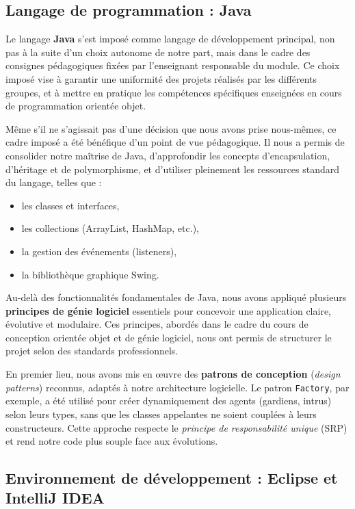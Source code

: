 \subsection{Langage de programmation : Java}

Le langage \textbf{Java} s’est imposé comme langage de développement principal, non pas à la suite d’un choix autonome de notre part, mais dans le cadre des consignes pédagogiques fixées par l’enseignant responsable du module. Ce choix imposé vise à garantir une uniformité des projets réalisés par les différents groupes, et à mettre en pratique les compétences spécifiques enseignées en cours de programmation orientée objet.

Même s’il ne s’agissait pas d’une décision que nous avons prise nous-mêmes, ce cadre imposé a été bénéfique d’un point de vue pédagogique. Il nous a permis de consolider notre maîtrise de Java, d’approfondir les concepts d'encapsulation, d’héritage et de polymorphisme, et d’utiliser pleinement les ressources standard du langage, telles que :
\begin{itemize}
    \item les classes et interfaces,
    \item les collections (ArrayList, HashMap, etc.),
    \item la gestion des événements (listeners),
    \item la bibliothèque graphique Swing.
\end{itemize}
Au-delà des fonctionnalités fondamentales de Java, nous avons appliqué plusieurs \textbf{principes de génie logiciel} essentiels pour concevoir une application claire, évolutive et modulaire. Ces principes, abordés dans le cadre du cours de conception orientée objet et de génie logiciel, nous ont permis de structurer le projet selon des standards professionnels.

En premier lieu, nous avons mis en œuvre des \textbf{patrons de conception} (\textit{design patterns}) reconnus, adaptés à notre architecture logicielle. Le patron \texttt{Factory}, par exemple, a été utilisé pour créer dynamiquement des agents (gardiens, intrus) selon leurs types, sans que les classes appelantes ne soient couplées à leurs constructeurs. Cette approche respecte le \textit{principe de responsabilité unique} (SRP) et rend notre code plus souple face aux évolutions.

\subsection{Environnement de développement : Eclipse et IntelliJ IDEA}

